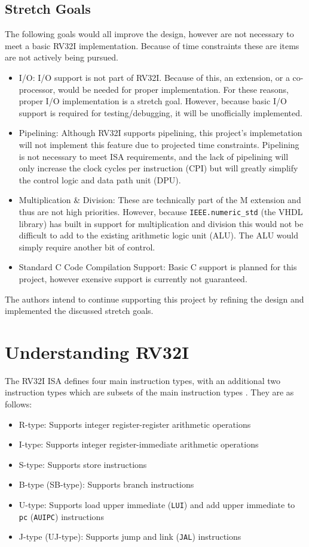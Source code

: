 \documentclass[lettersize,journal]{IEEEtran}
\begin{document}
\subsection{Stretch Goals}
The following goals would all improve the design, however are not necessary to meet a basic RV32I implementation.
Because of time constraints these are items are not actively being pursued.
\begin{itemize}
    \item I/O: I/O support is not part of RV32I. Because of this, an extension, or a co-processor, would be needed for proper implementation.
        For these reasons, proper I/O implementation is a stretch goal. However, because basic I/O support is required for testing/debugging, it will be unofficially
        implemented.
    \item Pipelining: Although RV32I supports pipelining, this project's implemetation will not implement this feature due to projected time constraints.
        Pipelining is not necessary to meet ISA requirements, and the lack of pipelining will only increase the clock cycles per instruction (CPI) but will greatly
        simplify the control logic and data path unit (DPU).
    \item Multiplication \& Division: These are technically part of the M extension \cite{riscvunprovisioned} and thus are not high priorities.
        However, because \verb|IEEE.numeric_std| (the VHDL library) has built in support for multiplication and division this would not be difficult to add to
        the existing arithmetic logic unit (ALU). The ALU would simply require another bit of control.
    \item Standard C Code Compilation Support: Basic C support is planned for this project, however exensive support is currently not guaranteed.
\end{itemize}

The authors intend to continue supporting this project by refining the design and implemented the discussed stretch goals.
 
\section{Understanding RV32I}
The RV32I ISA defines four main instruction types, with an additional two instruction types which are subsets of the main instruction types \cite{riscvunprovisioned}.
They are as follows:
\begin{itemize}
  \item R-type: Supports integer register-register arithmetic operations
  \item I-type: Supports integer register-immediate arithmetic operations
  \item S-type: Supports store instructions
  \item B-type (SB-type): Supports branch instructions
  \item U-type: Supports load upper immediate (\verb|LUI|) and add upper immediate to \verb|pc| (\verb|AUIPC|) instructions
  \item J-type (UJ-type): Supports jump and link (\verb|JAL|) instructions
\end{itemize}
\end{document}
